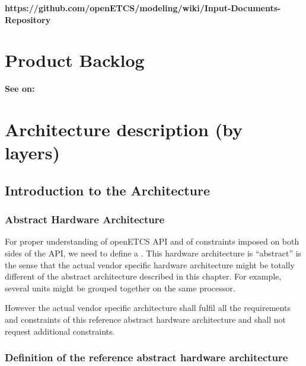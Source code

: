 \documentclass{template/openetcs_report}
\begin{document}
\textbf{https://github.com/openETCS/modeling/wiki/Input-Documents-Repository}\\


\chapter{Product Backlog}
\textbf{See on:}\\ 


\chapter{Architecture description (by layers)}

\section{Introduction to the Architecture}

\subsection{Abstract Hardware Architecture}

For proper understanding of openETCS \gls{API} and of constraints imposed on
both sides of the \gls{API}, we need to define a . This hardware architecture is ``abstract''
is the sense that the actual vendor specific hardware architecture
might be totally different of the abstract architecture described in
this chapter. For example, several units might be grouped together on
the same processor.

However the actual vendor specific architecture shall fulfil all the
requirements and constraints of this reference abstract hardware
architecture and shall not request additional constraints.

\subsection{Definition of the reference abstract hardware architecture}
\end{document}
